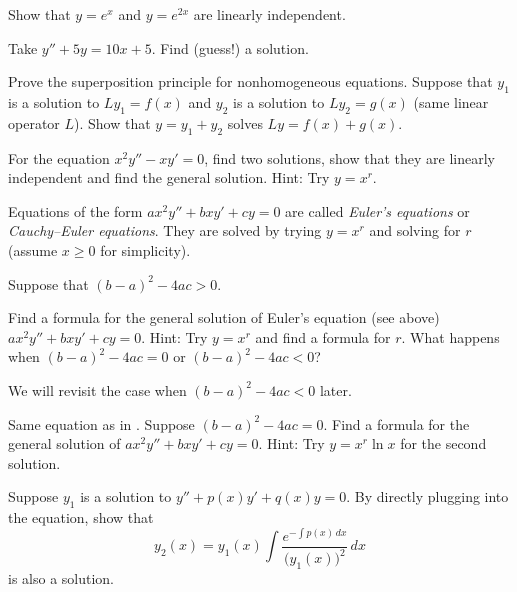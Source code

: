 \begin{exercise}
Show that $y=e^x$ and $y=e^{2x}$ are linearly independent.
\end{exercise}

\begin{exercise}
Take $y'' + 5 y = 10 x + 5$.  Find (guess!) a solution.
\end{exercise}

\begin{exercise}
Prove the superposition principle for nonhomogeneous equations.  Suppose that
$y_1$ is a solution to $L y_1 = f(x)$ and $y_2$ is a solution to
$L y_2 = g(x)$ (same linear operator $L$).  Show that $y = y_1+y_2$ solves
$Ly = f(x) + g(x)$.
\end{exercise}

\begin{exercise}
For the equation $x^2 y'' - x y' = 0$, find two solutions, show that they
are linearly independent and find the general solution.
Hint: Try $y = x^r$.
\end{exercise}

\pagebreak[2]
Equations of the form $a x^2 y'' + b x y' + c y = 0$ are called
\emph{Euler's equations} or
\emph{Cauchy--Euler equations}.
They are solved by trying
$y=x^r$ and solving for $r$ (assume $x \geq 0$ for simplicity).

\begin{exercise} \label{sol:eulerex}
\pagebreak[2]
Suppose that ${(b-a)}^2-4ac > 0$.
\begin{tasks}
\task Find a formula for the general solution
of Euler's equation (see above) $a x^2 y'' + b x y' + c y = 0$.
Hint: Try $y=x^r$ and find a formula for $r$.
\task What happens when ${(b-a)}^2-4ac = 0$ or ${(b-a)}^2-4ac < 0$?
\end{tasks}
\end{exercise}

We will revisit the case when ${(b-a)}^2-4ac < 0$ later.

\begin{exercise} \label{sol:eulerexln}
Same equation as in .
Suppose ${(b-a)}^2-4ac = 0$.  Find a formula for the general solution
of $a x^2 y'' + b x y' + c y = 0$.  Hint: Try $y=x^r \ln x$ for the second
solution.
\end{exercise}


\begin{exercise} \label{exercise:reductionoforder}
Suppose $y_1$ is a solution to $y'' + p(x) y' + q(x) y = 0$.
By directly plugging into the equation,
show that
\begin{equation*}
y_2(x) = y_1(x) \int \frac{e^{-\int p(x)\,dx}}{{\bigl(y_1(x)\bigr)}^2} \,dx
\end{equation*}
is also a solution.
\end{exercise}

